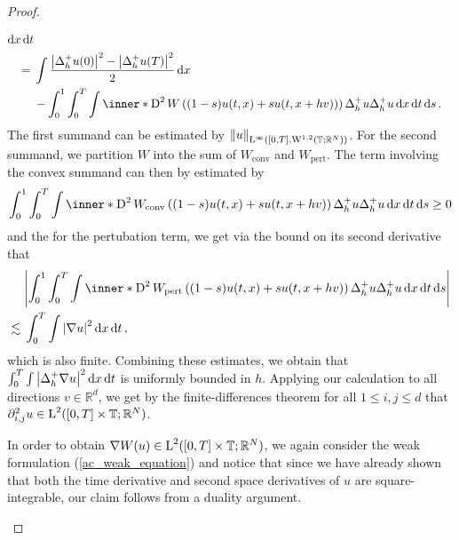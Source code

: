 \begin{proof}
\begin{description}[wide=0pt]
\begin{align*}
			\dd{ x }
		\dd{ t }
		\\
		={} &
		\int  
			\frac{ \abs{ \Delta_{ h }^{ + } u ( 0 ) }^{ 2 } - \abs{ \Delta_{ h }^{ + } u ( T ) }^{ 2 } }{ 2 }
		\dd{ x }
		\\
		& -
		\int_{ 0 }^{ 1 }
			\int_{ 0 }^{ T }
				\int
					\inner*{ 
						\diff^{ 2 } W \left( ( 1 - s ) u ( t, x  ) + s u( t,  x + h v ) ) \right) 
						\Delta_{ h }^{ + } u
					}{
					\Delta_{ h }^{ + } u 
					}
				\dd{ x }
			\dd{ t }
		\dd{ s }.
	\end{align*}
	The first summand can be estimated by $ \norm{ u }_{ \operatorname{L}^{ \infty } ( [0 , T ] , \operatorname{W}^{ 1 , 2 } ( \operatorname{\mathbb{T}} ; \mathbb{ R }^{ N } ) ) } $. For the second summand, we partition $ W $ into the sum of $ W_{ \mathrm{conv} } $ and $ W_{ \mathrm{pert} } $. The term involving the convex summand can then by estimated by
	\begin{equation*}
			\int_{ 0 }^{ 1 }
		\int_{ 0 }^{ T }
		\int
		\inner*{ 
			\diff^{ 2 } W_{ \mathrm{conv} } \left( ( 1- s ) u ( t, x  ) + s u( t,  x + h v ) \right) 
			\Delta_{ h }^{ + } u
		}{
			\Delta_{ h }^{ + } u 
		}
		\dd{ x }
		\dd{ t }
		\dd{ s }
		\geq 0 
	\end{equation*}
	and the for the pertubation term, we get via the bound on its second derivative that
	\begin{align*}
		& \abs{
		\int_{ 0 }^{ 1 }
		\int_{ 0 }^{ T }
		\int
		\inner*{ 
			\diff^{ 2 } W_{ \mathrm{pert} } \left( (1 - s ) u ( t, x  ) + s  u( t,  x + h v )  \right) 
			\Delta_{ h }^{ + } u
		}{
			\Delta_{ h }^{ + } u 
		}
		\dd{ x }
		\dd{ t }
		\dd{ s }
		}
		\\
		\lesssim {} &
		\int_{ 0 }^{ T }
			\int
				\abs{ \nabla u }^{ 2 }
			\dd{ x }
		\dd{ t },
	\end{align*}
	which is also finite. 
	Combining these estimates, we obtain that $ \int_{ 0 }^{ T } \int \abs{ \Delta_{ h }^{ + } \nabla u }^{ 2 } \dd{ x } \dd{ t } $ is uniformly bounded in $ h $. Applying our calculation to all directions $ v \in \mathbb{ R }^{ d } $, we get by the finite-differences theorem for all $ 1 \leq i, j \leq d $ that $ \partial_{ i , j }^{ 2 } u \in \operatorname{L}^{ 2 } ( [ 0 , T ] \times \operatorname{\mathbb{T}} ; \mathbb{ R }^{ N } ) $.
	
	In order to obtain $ \nabla W ( u ) \in \operatorname{L}^{ 2 } ( [ 0 , T ] \times \operatorname{\mathbb{T}} ; \mathbb{ R }^{ N } ) $, we again consider the weak formulation (\ref{ac_weak_equation}) and notice that since we have already shown that both the time derivative and second space derivatives of $ u $ are square-integrable, our claim follows from a duality argument. 
	\end{description}
\end{proof}

